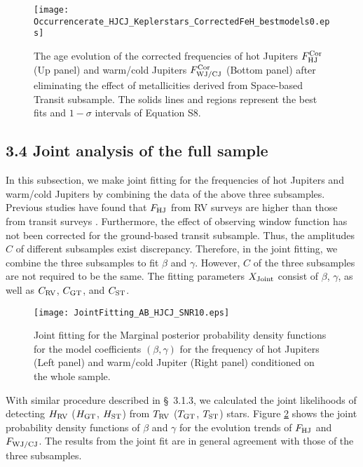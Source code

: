 \documentclass[twocolumn]{pnas-new}
\begin{document}
\begin{figure}[!t]
\centering
\texttt{[image: Occurrencerate\_HJCJ\_Keplerstars\_CorrectedFeH\_bestmodels0.eps]}
\caption{The age evolution of the corrected frequencies of hot Jupiters $F^{\rm Cor}_{\rm HJ}$ (Up panel) and warm/cold Jupiters $F^{\rm Cor}_{\rm WJ/CJ}$ (Bottom panel) after eliminating the effect of metallicities derived from Space-based Transit subsample.
The solids lines and regions represent the best fits and $1-\sigma$ intervals of Equation S8.
\label{figKeplerOccurrencerateDEFeH}}
\end{figure}


\subsection*{3.4 Joint analysis of the full sample}
\label{sec.fitting.Joint}
In this subsection, we make joint fitting for the frequencies of hot Jupiters and warm/cold Jupiters by combining the data of the above three subsamples.
Previous studies have found that $F_{\rm HJ}$ from RV surveys are higher than those from transit surveys \citep[see details in \S~4;][]{2021ARA&A..59..291Z}.
Furthermore, the effect of observing window function has not been corrected for the ground-based transit subsample.
Thus, the amplitudes $C$ of different subsamples exist discrepancy.
Therefore, in the joint fitting,
we combine the three subsamples to fit $\beta$ and $\gamma$.
However, $C$ of the three subsamples are not required to be the same.
The fitting parameters $X_{\rm Joint}$ consist of $\beta$, $\gamma$, as well as $C_{\rm RV}$, $C_{\rm GT}$, and $C_{\rm ST}$.

\begin{figure}[!t]
\centering
\texttt{[image: JointFitting\_AB\_HJCJ\_SNR10.eps]}
\caption{Joint fitting for the Marginal posterior probability density functions for the model coefficients $(\beta, \gamma)$ for the frequency of hot Jupiters (Left panel) and warm/cold Jupiter (Right panel) conditioned on the whole sample.
\label{figFHJCJJointfitting}}
\end{figure}

With similar procedure described in \S~3.1.3, we calculated the joint likelihoods of detecting $H_{\rm RV}$ ($H_{\rm GT}$, $H_{\rm ST}$) from $T_{\rm RV}$ ($T_{\rm GT}$, $T_{\rm ST}$) stars.
Figure \ref{figFHJCJJointfitting} shows the joint probability density functions of $\beta$ and $\gamma$ for the evolution trends of $F_{\rm HJ}$ and $F_{\rm WJ/CJ}$.
The results from the joint fit are in general agreement with those of the three subsamples.
\end{document}
